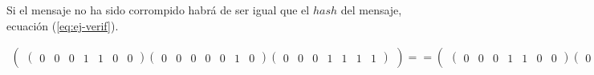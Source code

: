 Si el mensaje no ha sido corrompido habrá de ser igual que el $hash$ del mensaje, ecuación (\ref{eq:ej-verif}).

\begin{equation}\label{eq:ej-verif}
	\begin{aligned}
	\left(\begin{matrix}
		\left(\begin{smallmatrix}0 & 0 & 0 & 1 & 1 & 0 & 0\end{smallmatrix}\right)
		\left(\begin{smallmatrix}0 & 0 & 0 & 0 & 0 & 1 & 0\end{smallmatrix}\right)
		\left(\begin{smallmatrix}0 & 0 & 0 & 1 & 1 & 1 & 1\end{smallmatrix}\right)
	\end{matrix}\right)==\left(\begin{matrix}
		\left(\begin{smallmatrix}0 & 0 & 0 & 1 & 1 & 0 & 0\end{smallmatrix}\right)
		\left(\begin{smallmatrix}0 & 0 & 0 & 0 & 0 & 1 & 0\end{smallmatrix}\right)
		\left(\begin{smallmatrix}0 & 0 & 0 & 1 & 1 & 1 & 1\end{smallmatrix}\right)
	\end{matrix}\right)
	\end{aligned}
\end{equation}





